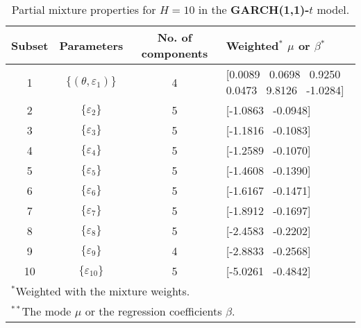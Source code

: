 \footnotesize{  
{ \renewcommand{\arraystretch}{1.2} 
\begin{longtable}{cccp{3.6cm}} 
\caption{Partial mixture properties for $H=10$ in the \textbf{GARCH(1,1)-$t$} model.} 
\label{tab:pmits_t_garch2_noS} \\ 
 Subset & Parameters & No. of components  & Weighted$^{*}$ $\mu$ or $\beta$$^{*}$ \\ \hline 
1 & $\{(\theta,\varepsilon_{1})\}$ & 4 & [0.0089 \, 0.0698 \, 0.9250 \, 0.0473 \, 9.8126 \, -1.0284] \\ [1ex] 
2 & $\{\varepsilon_{2}\}$ & 5 & [-1.0863 \, -0.0948]   \\ [1ex] 
3 & $\{\varepsilon_{3}\}$ & 5 & [-1.1816 \, -0.1083]   \\ [1ex] 
4 & $\{\varepsilon_{4}\}$ & 5 & [-1.2589 \, -0.1070]   \\ [1ex] 
5 & $\{\varepsilon_{5}\}$ & 5 & [-1.4608 \, -0.1390]   \\ [1ex] 
6 & $\{\varepsilon_{6}\}$ & 5 & [-1.6167 \, -0.1471]   \\ [1ex] 
7 & $\{\varepsilon_{7}\}$ & 5 & [-1.8912 \, -0.1697]   \\ [1ex] 
8 & $\{\varepsilon_{8}\}$ & 5 & [-2.4583 \, -0.2202]   \\ [1ex] 
9 & $\{\varepsilon_{9}\}$ & 4 & [-2.8833 \, -0.2568]   \\ [1ex] 
10 & $\{\varepsilon_{10}\}$ & 5 & [-5.0261 \, -0.4842]   \\ [1ex] 
\hline 
 \multicolumn{4}{l}{\footnotesize{$^{*}$Weighted with the mixture weights.}} \\ 
 \multicolumn{4}{l}{\footnotesize{$^{**}$The mode $\mu$ or the regression coefficients $\beta$.}} \\ 
\end{longtable} 
} 
} 
 
\normalsize 
